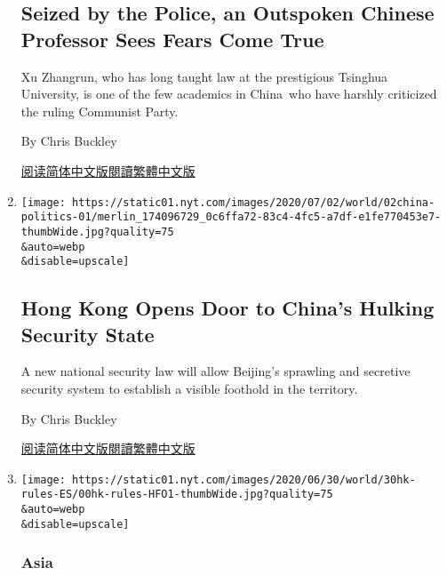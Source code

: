 \begin{enumerate}
  \hypertarget{seized-by-the-police-an-outspoken-chinese-professor-sees-fears-come-true}{%
  \subsection{Seized by the Police, an Outspoken Chinese Professor Sees
  Fears Come
  True}\label{seized-by-the-police-an-outspoken-chinese-professor-sees-fears-come-true}}

  Xu Zhangrun, who has long taught law at the prestigious Tsinghua
  University, is one of the few academics in China~who have harshly
  criticized the ruling Communist Party.

  By Chris Buckley

  \href{https://cn.nytimes.com/china/20200706/china-detains-xu-zhangrun-critic/}{阅读简体中文版}\href{https://cn.nytimes.com/china/20200706/china-detains-xu-zhangrun-critic/zh-hant/}{閱讀繁體中文版}
\item
  \href{/2020/07/02/world/asia/hong-kong-security-china.html}{}

  \texttt{[image: https://static01.nyt.com/images/2020/07/02/world/02china-politics-01/merlin\_174096729\_0c6ffa72-83c4-4fc5-a7df-e1fe770453e7-thumbWide.jpg?quality=75\\\&auto=webp\\\&disable=upscale]}

  \hypertarget{hong-kong-opens-door-to-chinas-hulking-security-state}{%
  \subsection{Hong Kong Opens Door to China's Hulking Security
  State}\label{hong-kong-opens-door-to-chinas-hulking-security-state}}

  A new national security law will allow Beijing's sprawling and
  secretive security system to establish a visible foothold in the
  territory.

  By Chris Buckley

  \href{https://cn.nytimes.com/china/20200703/hong-kong-security-china/}{阅读简体中文版}\href{https://cn.nytimes.com/china/20200703/hong-kong-security-china/zh-hant/}{閱讀繁體中文版}
\item
  \href{/es/2020/06/30/espanol/mundo/hong-kong-china-leyes-seguridad.html}{}

  \texttt{[image: https://static01.nyt.com/images/2020/06/30/world/30hk-rules-ES/00hk-rules-HFO1-thumbWide.jpg?quality=75\\\&auto=webp\\\&disable=upscale]}

  \hypertarget{asia}{%
  \subsubsection{Asia}\label{asia}}


\end{enumerate}
